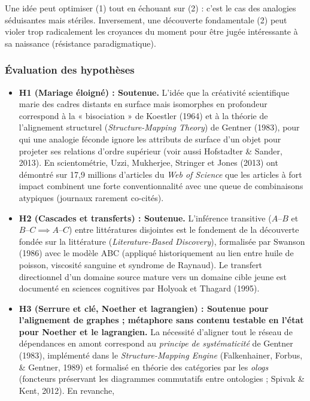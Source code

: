 \documentclass[a4paper,11pt]{article}
\providecommand{\tightlist}{\setlength{\itemsep}{0pt}\setlength{\parskip}{0pt}}
\begin{document}
Une idée peut optimiser (1) tout en échouant sur (2) : c'est le cas des
analogies séduisantes mais stériles. Inversement, une découverte
fondamentale (2) peut violer trop radicalement les croyances du moment
pour être jugée intéressante à sa naissance (résistance paradigmatique).

\subsubsection*{Évaluation des hypothèses}

\begin{itemize}
\tightlist
\item
  \textbf{H1 (Mariage éloigné) : Soutenue.} L'idée que la créativité
  scientifique marie des cadres distants en surface mais isomorphes en
  profondeur correspond à la « bisociation » de Koestler (1964) et à la
  théorie de l'alignement structurel (\emph{Structure-Mapping Theory})
  de Gentner (1983), pour qui une analogie féconde ignore les attributs
  de surface d'un objet pour projeter ses relations d'ordre supérieur
  (voir aussi Hofstadter \& Sander, 2013). En scientométrie, Uzzi,
  Mukherjee, Stringer et Jones (2013) ont démontré sur 17,9 millions
  d'articles du \emph{Web of Science} que les articles à fort impact
  combinent une forte conventionnalité avec une queue de combinaisons
  atypiques (journaux rarement co-cités).
\item
  \textbf{H2 (Cascades et transferts) : Soutenue.} L'inférence
  transitive (\(A\text{--}B\) et \(B\text{--}C \implies A\text{--}C\))
  entre littératures disjointes est le fondement de la découverte fondée
  sur la littérature (\emph{Literature-Based Discovery}), formalisée par
  Swanson (1986) avec le modèle ABC (appliqué historiquement au lien
  entre huile de poisson, viscosité sanguine et syndrome de Raynaud). Le
  transfert directionnel d'un domaine source mature vers un domaine
  cible jeune est documenté en sciences cognitives par Holyoak et
  Thagard (1995).
\item
  \textbf{H3 (Serrure et clé, Noether et lagrangien) : Soutenue pour
  l'alignement de graphes ; métaphore sans contenu testable en l'état
  pour Noether et le lagrangien.} La nécessité d'aligner tout le réseau
  de dépendances en amont correspond au \emph{principe de systématicité}
  de Gentner (1983), implémenté dans le \emph{Structure-Mapping Engine}
  (Falkenhainer, Forbus, \& Gentner, 1989) et formalisé en théorie des
  catégories par les \emph{ologs} (foncteurs préservant les diagrammes
  commutatifs entre ontologies ; Spivak \& Kent, 2012). En revanche,

\end{itemize}
\end{document}
